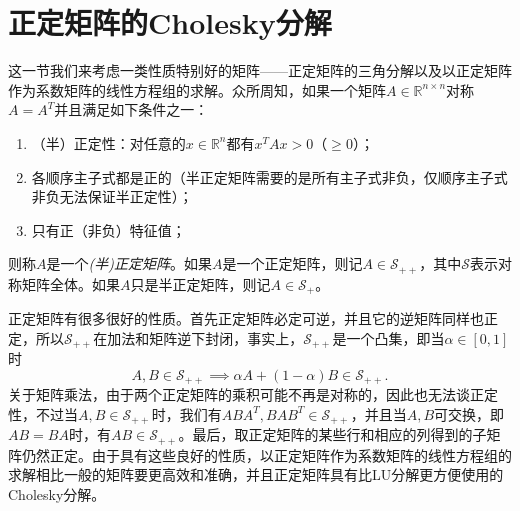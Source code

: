 \documentclass[a4paper,10pt]{ctexart}
\begin{document}
\section{正定矩阵的Cholesky分解}
这一节我们来考虑一类性质特别好的矩阵——正定矩阵的三角分解以及以正定矩阵作为系数矩阵的线性方程组的求解。众所周知，如果一个矩阵$ A\in \mathbb{R}^{n\times n} $对称$ A=A^T $并且满足如下条件之一：
\begin{enumerate}
    \item （半）正定性：对任意的$ x\in \mathbb{R}^n $都有$ x^TAx>0 $（$ \geqslant 0 $）；
    \item 各顺序主子式都是正的（半正定矩阵需要的是所有主子式非负，仅顺序主子式非负无法保证半正定性）；
    \item 只有正（非负）特征值；
\end{enumerate}
则称$ A $是一个\emph{(半)正定矩阵}。如果$ A $是一个正定矩阵，则记$ A\in \mathcal{S}_{++} $，其中$ \mathcal{S} $表示对称矩阵全体。如果$ A $只是半正定矩阵，则记$ A\in \mathcal{S}_{+} $。

正定矩阵有很多很好的性质。首先正定矩阵必定可逆，并且它的逆矩阵同样也正定，所以$ \mathcal{S}_{++} $在加法和矩阵逆下封闭，事实上，$ \mathcal{S}_{++} $是一个凸集，即当$ \alpha\in [0,1] $时
\[
    A,B\in \mathcal{S}_{++}\implies \alpha A + (1-\alpha) B\in \mathcal{S}_{++}.
\]
关于矩阵乘法，由于两个正定矩阵的乘积可能不再是对称的，因此也无法谈正定性，不过当$ A,B\in \mathcal{S}_{++} $时，我们有$ ABA^T,BAB^T\in \mathcal{S}_{++} $，并且当$ A,B $可交换，即$ AB = BA $时，有$ AB \in \mathcal{S}_{++} $。最后，取正定矩阵的某些行和相应的列得到的子矩阵仍然正定。由于具有这些良好的性质，以正定矩阵作为系数矩阵的线性方程组的求解相比一般的矩阵要更高效和准确，并且正定矩阵具有比LU分解更方便使用的Cholesky分解。
\end{document}
